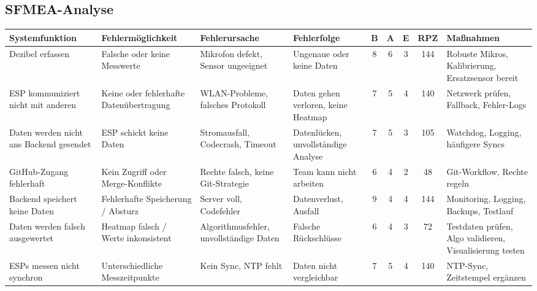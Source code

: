 \begin{landscape}
\chapter{SFMEA-Analyse}
\small
\begin{longtable}{|p{3.4cm}|p{3.4cm}|p{3.4cm}|p{3.4cm}|c|c|c|c|p{3.4cm}|}

    \hline
    \textbf{Systemfunktion} & \textbf{Fehlermöglichkeit} & \textbf{Fehlerursache} & \textbf{Fehlerfolge} & \textbf{B} & \textbf{A} & \textbf{E} & \textbf{RPZ} & \textbf{Maßnahmen} \\
    \hline
    \endhead

    Dezibel erfassen & Falsche oder keine Messwerte & Mikrofon defekt, Sensor ungeeignet & Ungenaue oder keine Daten & 8 & 6 & 3 & 144 & Robuste Mikros, Kalibrierung, Ersatzsensor bereit \\
    \hline
    ESP kommuniziert nicht mit anderen & Keine oder fehlerhafte Datenübertragung & WLAN-Probleme, falsches Protokoll & Daten gehen verloren, keine Heatmap & 7 & 5 & 4 & 140 & Netzwerk prüfen, Fallback, Fehler-Logs \\
    \hline
    Daten werden nicht ans Backend gesendet & ESP schickt keine Daten & Stromausfall, Codecrash, Timeout & Datenlücken, unvollständige Analyse & 7 & 5 & 3 & 105 & Watchdog, Logging, häufigere Syncs \\
    \hline
    GitHub-Zugang fehlerhaft & Kein Zugriff oder Merge-Konflikte & Rechte falsch, keine Git-Strategie & Team kann nicht arbeiten & 6 & 4 & 2 & 48 & Git-Workflow, Rechte regeln \\
    \hline
    Backend speichert keine Daten & Fehlerhafte Speicherung / Absturz & Server voll, Codefehler & Datenverlust, Ausfall & 9 & 4 & 4 & 144 & Monitoring, Logging, Backups, Testlauf \\
    \hline
    Daten werden falsch ausgewertet & Heatmap falsch / Werte inkonsistent & Algorithmusfehler, unvollständige Daten & Falsche Rückschlüsse & 6 & 4 & 3 & 72 & Testdaten prüfen, Algo validieren, Visualisierung testen \\
    \hline
    ESPs messen nicht synchron & Unterschiedliche Messzeitpunkte & Kein Sync, NTP fehlt & Daten nicht vergleichbar & 7 & 5 & 4 & 140 & NTP-Sync, Zeitstempel ergänzen \\
    \hline

\end{longtable}
\end{landscape}
